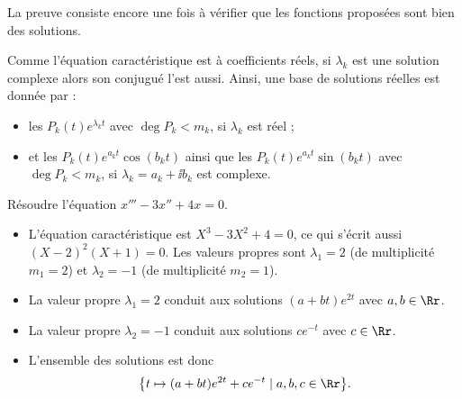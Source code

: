\documentclass[12pt, class=report,crop=false]{standalone}
\begin{document}
La preuve consiste encore une fois à vérifier que les fonctions proposées sont bien des solutions.


Comme l'équation caractéristique est à coefficients réels,  
si $\lambda_k$ est une solution complexe alors son conjugué l'est aussi.
Ainsi, une base  de solutions réelles est donnée par :
\begin{itemize}
  \item les $P_k(t)e^{\lambda_k t}$ avec $\deg P_k < m_k$, si $\lambda_k$ est réel ;
  \item et les $P_k(t) e^{a_k t} \cos(b_kt)$ ainsi que
  les $P_k(t) e^{a_k t} \sin(b_kt)$ avec $\deg P_k < m_k$, si $\lambda_k = a_k + \ii b_k$ est complexe.
\end{itemize}
  
\begin{exemple}
Résoudre l'équation $x''' - 3x'' + 4 x=0$.

\begin{itemize}
  \item L'équation caractéristique est $X^3 - 3X^2 + 4=0$, ce qui s'écrit aussi
$(X-2)^2(X+1)=0$. Les valeurs propres sont $\lambda_1 = 2$ (de multiplicité $m_1 = 2$)
et $\lambda_2 = -1$ (de multiplicité $m_2 = 1$).

  \item La valeur propre $\lambda_1 = 2$ conduit aux solutions
  $(a+bt)e^{2t}$ avec $a,b \in \Rr$.

  \item La valeur propre $\lambda_2 = -1$ conduit aux solutions $ce^{-t}$ avec $c\in\Rr$.
  
  \item L'ensemble des solutions est donc
  $$\big\{ t \mapsto (a+bt)e^{2t} + ce^{-t} \mid a,b,c \in \Rr \big\}.$$
\end{itemize}
\end{exemple}
\end{document}
